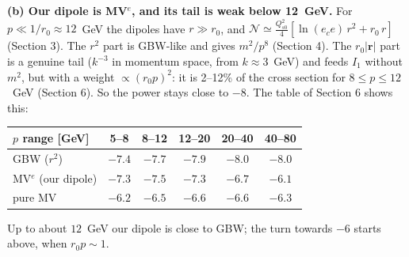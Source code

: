 \documentclass[12pt]{article}
\begin{document}
\textbf{(b) Our dipole is MV$^e$, and its tail is weak below 12~GeV.} For $p\ll1/r_0\approx12$~GeV the
dipoles have $r\gg r_0$, and $\mathcal N\simeq\frac{Q_{s0}^2}{4}[\ln(e_ce)\,r^2+r_0\,r]$ (Section 3). The
$r^2$ part is GBW-like and gives $m^2/p^8$ (Section 4). The $r_0|\mathbf r|$ part is a genuine tail ($k^{-3}$
in momentum space, from $k\approx3$~GeV) and feeds $I_1$ without $m^2$, but with a weight
$\propto(r_0p)^2$: it is 2--12\% of the cross section for $8\le p\le12$~GeV (Section 6). So the power stays
close to $-8$. The table of Section 6 shows this:
\begin{center}
\begin{tabular}{lccccc}
\toprule
$p$ range [GeV] & 5--8 & 8--12 & 12--20 & 20--40 & 40--80 \\
\midrule
GBW ($r^2$)          & $-7.4$ & $-7.7$ & $-7.9$ & $-8.0$ & $-8.0$ \\
MV$^e$ (our dipole)  & $-7.3$ & $-7.5$ & $-7.3$ & $-6.7$ & $-6.1$ \\
pure MV              & $-6.2$ & $-6.5$ & $-6.6$ & $-6.6$ & $-6.3$ \\
\bottomrule
\end{tabular}
\end{center}
Up to about $12$~GeV our dipole is close to GBW; the turn towards $-6$ starts above, when $r_0p\sim1$.
\end{document}
